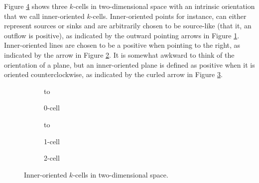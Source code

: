 Figure \ref{fig:innerExample} shows three $k$-cells in two-dimensional space with an intrinsic orientation that we call inner-oriented $k$-cells. Inner-oriented points for instance, can either represent sources or sinks and are arbitrarily chosen to be source-like (that it, an outflow is positive), as indicated by the outward pointing arrows in Figure \ref{fig:inner0Cell}. Inner-oriented lines are chosen to be a positive when pointing to the right, as indicated by the arrow in Figure \ref{fig:inner1Cell}. It is somewhat awkward to think of the orientation of a plane, but an inner-oriented plane is defined as positive when it is oriented counterclockwise, as indicated by the curled arrow in Figure \ref{fig:inner2Cell}.
\begin{figure}[h]
    \newsavebox\boxInner
    \centering
    \begin{subfigure}[c]{0.3\textwidth}
        \centering
        \vbox to \ht{}
        \caption{0-cell}
        \label{fig:inner0Cell}
    \end{subfigure}
    \begin{subfigure}[c]{0.3\textwidth}
        \centering
        \vbox to \ht{}
        \caption{1-cell}
        \label{fig:inner1Cell}
    \end{subfigure}
    \begin{subfigure}[c]{0.3\textwidth}
        \centering
        \centering
        \usebox{\boxInner}
        \caption{2-cell}
        \label{fig:inner2Cell}
    \end{subfigure}
    \caption{Inner-oriented $k$-cells in two-dimensional space.}
    \label{fig:innerExample}
\end{figure}
